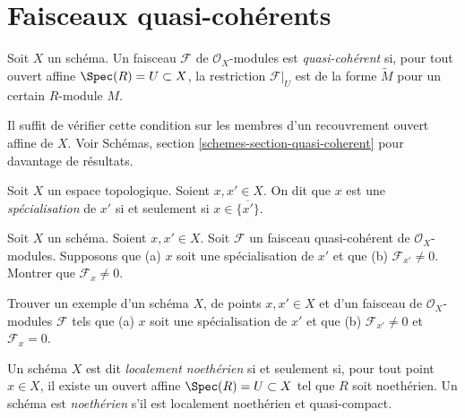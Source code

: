 \section{Faisceaux quasi-cohérents}
\label{section-quasi-coherent}

\begin{definition}
\label{definition-quasi-coherent}
Soit $X$ un schéma.
Un faisceau $\mathcal{F}$ de $\mathcal{O}_X$-modules est {\it quasi-cohérent}
si, pour tout ouvert affine $\Spec(R) = U \subset X$, la restriction
$\mathcal{F}|_U$ est de la forme $\widetilde M$ pour un certain $R$-module
$M$.
\end{definition}

\noindent
Il suffit de vérifier cette condition sur les membres d'un
recouvrement ouvert affine de $X$.
Voir Schémas, section \ref{schemes-section-quasi-coherent}
pour davantage de résultats.

\begin{definition}
\label{definition-specialization}
Soit $X$ un espace topologique. Soient $x, x' \in X$.
On dit que $x$ est une {\it spécialisation} de $x'$
si et seulement si $x \in \overline{\{x'\}}$.
\end{definition}

\begin{exercise}
\label{exercise-quasi-coherent-specialization-points}
Soit $X$ un schéma. Soient $x, x' \in X$. Soit $\mathcal{F}$
un faisceau quasi-cohérent de $\mathcal{O}_X$-modules.
Supposons que (a) $x$ soit une spécialisation de $x'$ et que (b)
$\mathcal{F}_{x'} \not = 0$. Montrer que $\mathcal{F}_x \not = 0$.
\end{exercise}

\begin{exercise}
\label{exercise-O-module-specialization-points}
Trouver un exemple d'un schéma $X$, de points $x, x' \in X$ et
d'un faisceau de $\mathcal{O}_X$-modules
$\mathcal{F}$ tels que (a) $x$ soit une spécialisation de $x'$ et que (b)
$\mathcal{F}_{x'} \not = 0$ et $\mathcal{F}_x = 0$.
\end{exercise}

\begin{definition}
\label{definition-Noetherian-scheme}
Un schéma $X$ est dit {\it localement noethérien} si et seulement si,
pour tout point $x \in X$, il existe un ouvert affine
$\Spec(R) = U \subset X$ tel que $R$ soit noethérien.
Un schéma est {\it noethérien} s'il est localement noethérien et quasi-compact.
\end{definition}

